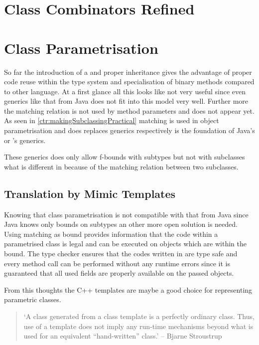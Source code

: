 
\section{Class Combinators Refined}

\section{Class Parametrisation}
So far the introduction of a \mytype and proper inheritance gives the
advantage of proper code reuse within the type system and specialisation
of binary methods compared to other language. At a first glance all
this looks like not very useful since even generics like that from
Java does not fit into this model very well. Further more the matching
relation is not used by method parameters and does not appear yet. As
seen in \cref{ctr:makingSubclassingPractical} matching is used in object
parametrisation and does replaces generics respectively is the foundation
of Java's or \cs's generics.

These generics does only allow f-bounds with subtypes but not with
subclasses what is different in \ooplss because of the matching relation
between two subclasses.

\subsection{Translation by Mimic Templates}
Knowing that \ooplss class parametrisation is not compatible with that
from Java since Java knows only bounds on subtypes an other more open
solution is needed.  Using matching as bound provides information that
the code within a parametrised class is legal and can be executed on
objects which are within the bound. The type checker ensures that the
codes written in \ooplss are type safe and every method call can be
performed without any runtime errors since it is guaranteed that all
used fields are properly available on the passed objects.

From this thoughts the C++ templates are maybe a good choice for
representing parametric classes.

\begin{quotation}
`A class generated from a class template is a perfectly ordinary
class. Thus, use of a template does not imply any run-time mechanisms
beyond what is used for an equivalent ``hand-written'' class.' -- Bjarne
Stroustrup \cite{stroustrup_c++_2000}
\end{quotation}

